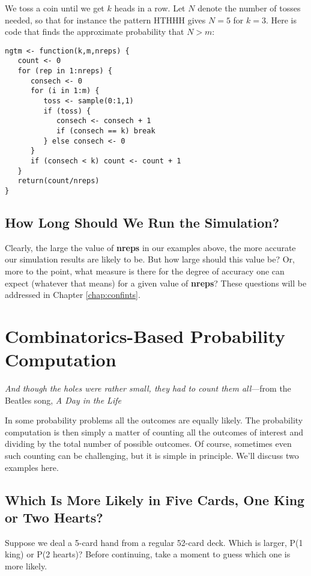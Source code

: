 We toss a coin until we get $k$ heads in a row.  Let $N$ denote the
number of tosses needed, so that for instance the pattern HTHHH gives $N
= 5$ for $k = 3$.  Here is code that finds the approximate probability
that $N > m$:

\begin{lstlisting}
ngtm <- function(k,m,nreps) {
   count <- 0
   for (rep in 1:nreps) {
      consech <- 0
      for (i in 1:m) {
         toss <- sample(0:1,1)
         if (toss) {
            consech <- consech + 1
            if (consech == k) break
         } else consech <- 0
      }
      if (consech < k) count <- count + 1
   }
   return(count/nreps)
}
\end{lstlisting}

\subsection{How Long Should We Run the Simulation?}

Clearly, the large the value of {\bf nreps} in our examples above, the
more accurate our simulation results are likely to be.  But how large
should this value be?  Or, more to the point, what measure is there for
the degree of accuracy one can expect (whatever that means) for a given
value of {\bf nreps}?  These questions will be addressed in Chapter
\ref{chap:confints}.

\section{Combinatorics-Based Probability Computation}
\label{comb}

{\it And though the holes were rather small, they had to count them
all}---from the Beatles song, {\it A Day in the Life}

\bigskip

In some probability problems all the outcomes are equally likely.  The
probability computation is then simply a matter of counting all the
outcomes of interest and dividing by the total number of possible
outcomes.  Of course, sometimes even such counting can be challenging,
but it is simple in principle.  We'll discuss two examples here.

\subsection{Which Is More Likely in Five Cards, One King or Two
Hearts?}
\label{hearts}

Suppose we deal a 5-card hand from a regular 52-card deck.  Which is
larger, P(1 king) or P(2 hearts)?  Before continuing, take a moment to
guess which one is more likely.

